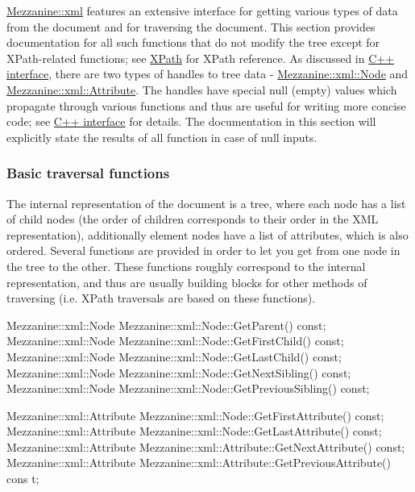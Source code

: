 \hyperlink{namespaceMezzanine_1_1xml}{Mezzanine::xml} features an extensive interface for getting various types of data from the document and for traversing the document. This section provides documentation for all such functions that do not modify the tree except for XPath-\/related functions; see \hyperlink{XMLManual_XMLXPath}{XPath} for XPath reference. As discussed in \hyperlink{XMLManual_XMLInterface}{C++ interface}, there are two types of handles to tree data -\/ \hyperlink{classMezzanine_1_1xml_1_1Node}{Mezzanine::xml::Node} and \hyperlink{classMezzanine_1_1xml_1_1Attribute}{Mezzanine::xml::Attribute}. The handles have special null (empty) values which propagate through various functions and thus are useful for writing more concise code; see \hyperlink{XMLManual_XMLInterface}{C++ interface} for details. The documentation in this section will explicitly state the results of all function in case of null inputs. \hypertarget{XMLManual_XMLAccessingBasics}{}\subsubsection{Basic traversal functions}\label{XMLManual_XMLAccessingBasics}
The internal representation of the document is a tree, where each node has a list of child nodes (the order of children corresponds to their order in the XML representation), additionally element nodes have a list of attributes, which is also ordered. Several functions are provided in order to let you get from one node in the tree to the other. These functions roughly correspond to the internal representation, and thus are usually building blocks for other methods of traversing (i.e. XPath traversals are based on these functions). 
\begin{DoxyCode}
 Mezzanine::xml::Node Mezzanine::xml::Node::GetParent() const;
 Mezzanine::xml::Node Mezzanine::xml::Node::GetFirstChild() const;
 Mezzanine::xml::Node Mezzanine::xml::Node::GetLastChild() const;
 Mezzanine::xml::Node Mezzanine::xml::Node::GetNextSibling() const;
 Mezzanine::xml::Node Mezzanine::xml::Node::GetPreviousSibling() const;

 Mezzanine::xml::Attribute Mezzanine::xml::Node::GetFirstAttribute() const;
 Mezzanine::xml::Attribute Mezzanine::xml::Node::GetLastAttribute() const;
 Mezzanine::xml::Attribute Mezzanine::xml::Attribute::GetNextAttribute() const;
 Mezzanine::xml::Attribute Mezzanine::xml::Attribute::GetPreviousAttribute() cons
      t;
\end{DoxyCode}
